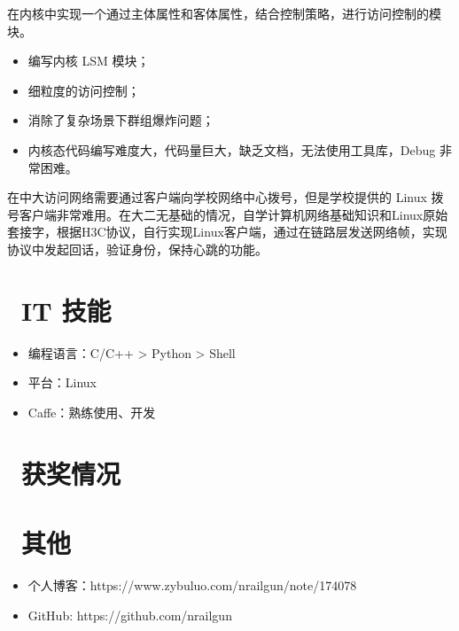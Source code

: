 \documentclass{resume}
\begin{document}
\begin{onehalfspacing}
在内核中实现一个通过主体属性和客体属性，结合控制策略，进行访问控制的模块。
\begin{itemize}
  \item 编写内核 LSM 模块；
  \item 细粒度的访问控制；
  \item 消除了复杂场景下群组爆炸问题；
  \item 内核态代码编写难度大，代码量巨大，缺乏文档，无法使用工具库，Debug 非常困难。
\end{itemize}
\end{onehalfspacing}

\begin{onehalfspacing}
在中大访问网络需要通过客户端向学校网络中心拨号，但是学校提供的 Linux 拨号客户端非常难用。在大二无基础的情况，自学计算机网络基础知识和Linux原始套接字，根据H3C协议，自行实现Linux客户端，通过在链路层发送网络帧，实现协议中发起回话，验证身份，保持心跳的功能。
\end{onehalfspacing}


\section{\faCogs\ IT 技能}
\begin{itemize}[parsep=0.5ex]
  \item 编程语言：C/C++ > Python > Shell
  \item 平台：Linux
  \item Caffe：熟练使用、开发
\end{itemize}

\section{\faHeartO\ 获奖情况}

\section{\faInfo\ 其他}
\begin{itemize}[parsep=0.5ex]
  \item 个人博客：https://www.zybuluo.com/nrailgun/note/174078
  \item GitHub: https://github.com/nrailgun
\end{itemize}

%
%
\end{document}
